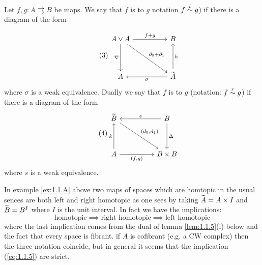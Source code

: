 \documentclass[../main]{subfiles}
\begin{document}
\begin{definition}\label{def:1.1.3}
	Let $f,g:A\rightrightarrows B$ be maps. We say that $f$ is  to $g$ notation $f\overset{l}{\sim} g$) if there is a diagram of the form

	\[\tag{3}\label{diag:1.1.3}\begin{tikzcd}
		{A\vee A} && B \\
		\\
		A && {\xtilde{A}}
		\arrow["{f+g}", from=1-1, to=1-3]
		\arrow["h"', from=3-3, to=1-3]
		\arrow["\sigma", from=3-3, to=3-1]
		\arrow["\nabla"', from=1-1, to=3-1]
		\arrow["{\partial_0+\partial_1}", from=1-1, to=3-3]
	\end{tikzcd}\]
	where $\sigma$ is a weak equivalence. Dually we say that $f$ is  to $g$ (notation: $f\overset{r}{\sim} g$) if there is a diagram of the form
	\[\tag{4}\label{diag:1.1.4}\begin{tikzcd}
		{\xtilde{B}} && B \\
		\\
		A && {B\times B}
		\arrow["k", from=3-1, to=1-1]
		\arrow["s"', from=1-3, to=1-1]
		\arrow["\Delta", from=1-3, to=3-3]
		\arrow["{(f,g)}"', from=3-1, to=3-3]
		\arrow["{(d_0,d_1)}", from=1-1, to=3-3]
	\end{tikzcd}\]
	where $s$ is a weak equivalence.
\end{definition}

\begin{remark*}
	In example \ref{ex:1.1.A} above two maps of spaces which are homtopic in the usual sences are both left and right homotopic as one sees by taking $\xtilde{A}=A\times I$ and $\xtilde{B}=B^I$ where $I$ is the unit interval. In fact we have the implications:
	\[\tag{5}\label{eq:1.1.5} \text{homotopic} \implies \text{right homotopic} \implies \text{left homotopic}\]
	where the last implication comes from the dual of lemma \ref{lem:1.1.5}(i) below and the fact that every space is fibrant. if $A$ is cofibrant (e.g. a CW complex) then the three notation coincide, but in general it seems that the implication (\ref{eq:1.1.5}) are strict.
\end{remark*}
\end{document}
